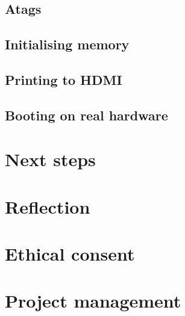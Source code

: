 \documentclass[10pt,a4paper]{article}
\begin{document}
\subsection{Atags}
\subsection{Initialising memory}
\subsection{Printing to HDMI}
\subsection{Booting on real hardware}


\section{Next steps}

\section{Reflection}

\section{Ethical consent}

\section{Project management}

\appendix


\end{document}

